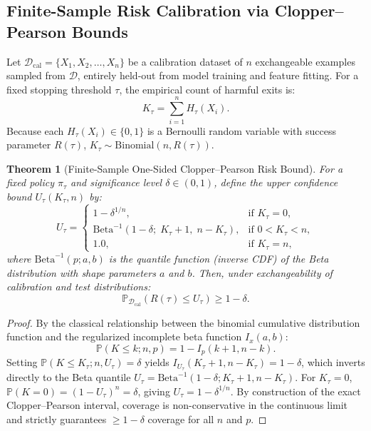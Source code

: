 \documentclass[11pt]{article}
\newtheorem{theorem}{Theorem}
\newcommand{\Prb}{\mathbb{P}}
\newcommand{\calD}{\mathcal{D}}
\begin{document}
\subsection{Finite-Sample Risk Calibration via Clopper--Pearson Bounds}
Let $\mathcal{D}_{\mathrm{cal}} = \{X_1, X_2, \dots, X_n\}$ be a calibration dataset of $n$ exchangeable examples sampled from $\calD$, entirely held-out from model training and feature fitting. For a fixed stopping threshold $\tau$, the empirical count of harmful exits is:
\begin{equation}
  K_\tau = \sum_{i=1}^n H_\tau(X_i).
\end{equation}
Because each $H_\tau(X_i) \in \{0, 1\}$ is a Bernoulli random variable with success parameter $R(\tau)$, $K_\tau \sim \mathrm{Binomial}(n, R(\tau))$.

\begin{theorem}[Finite-Sample One-Sided Clopper--Pearson Risk Bound]
\label{thm:cp_bound}
For a fixed policy $\pi_\tau$ and significance level $\delta \in (0, 1)$, define the upper confidence bound $U_\tau(K_\tau, n)$ by:
\begin{equation}
  U_\tau =
  \begin{cases}
    1 - \delta^{1/n}, & \text{if } K_\tau = 0, \\
    \mathrm{Beta}^{-1}(1-\delta;\; K_\tau + 1,\; n - K_\tau), & \text{if } 0 < K_\tau < n, \\
    1.0, & \text{if } K_\tau = n,
  \end{cases}
\end{equation}
where $\mathrm{Beta}^{-1}(p; a, b)$ is the quantile function (inverse CDF) of the Beta distribution with shape parameters $a$ and $b$. Then, under exchangeability of calibration and test distributions:
\begin{equation}
  \Prb_{\calD_{\mathrm{cal}}}\!\left(R(\tau) \le U_\tau\right) \ge 1 - \delta.
\end{equation}
\end{theorem}
\begin{proof}
By the classical relationship between the binomial cumulative distribution function and the regularized incomplete beta function $I_x(a, b)$:
\[
  \Prb(K \le k; n, p) = 1 - I_p(k+1, n-k).
\]
Setting $\Prb(K \le K_\tau; n, U_\tau) = \delta$ yields $I_{U_\tau}(K_\tau + 1, n - K_\tau) = 1 - \delta$, which inverts directly to the Beta quantile $U_\tau = \mathrm{Beta}^{-1}(1-\delta; K_\tau+1, n-K_\tau)$. For $K_\tau=0$, $\Prb(K=0) = (1-U_\tau)^n = \delta$, giving $U_\tau = 1 - \delta^{1/n}$. By construction of the exact Clopper--Pearson interval, coverage is non-conservative in the continuous limit and strictly guarantees $\ge 1-\delta$ coverage for all $n$ and $p$.
\end{proof}
\end{document}
